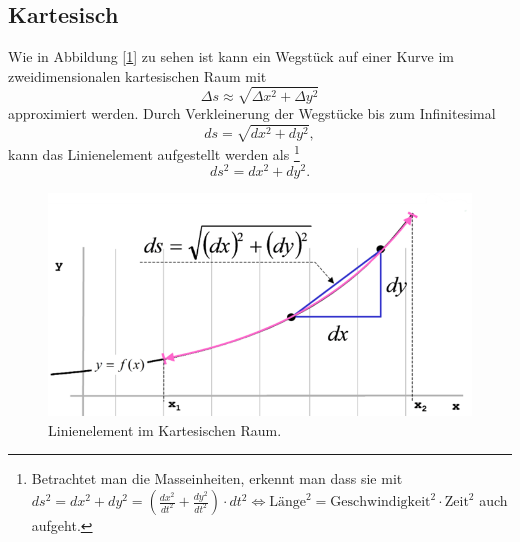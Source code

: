 %
%
%
%
\subsection{Kartesisch\label{geodaeten:section:Linienelemente:Kartesisch}}

Wie in Abbildung [\ref{geodaeten:figure:Linienelemente:Kartesisch:figure1}] zu sehen ist kann ein Wegstück auf einer Kurve im zweidimensionalen kartesischen Raum mit
\begin{equation}
	\Delta s \approx \sqrt{\Delta x^2 + \Delta y^2}
\end{equation}
approximiert werden.
Durch Verkleinerung der Wegstücke bis zum Infinitesimal 
\begin{equation}
	d s = \sqrt{d x^2 + d y^2},
\end{equation}
kann das Linienelement aufgestellt werden als \footnote{
Betrachtet man die Masseinheiten, erkennt man dass sie mit $ds^2 = dx^2 + dy^2 = \left( \frac{dx^2}{dt^2}+\frac{dy^2}{dt^2} \right) \cdot dt^2 \Leftrightarrow \text{Länge}^2 = \text{Geschwindigkeit}^2 \cdot \text{Zeit}^2$ auch aufgeht.
}
\begin{equation}
 	ds^2 = d x^2 + d y^2.
 	\label{geodaeten:equation:Linienelemente:Kartesisch:equation1}
\end{equation}

\begin{figure}
	\centering
	
	\includegraphics[width=0.7\linewidth]{papers/geodaeten/Abbildungen/Linienelemente/LinKartes1}
	\caption{Linienelement im Kartesischen Raum. \cite{geodaeten:kartesisch}} 
	\label{geodaeten:figure:Linienelemente:Kartesisch:figure1}	
\end{figure}
